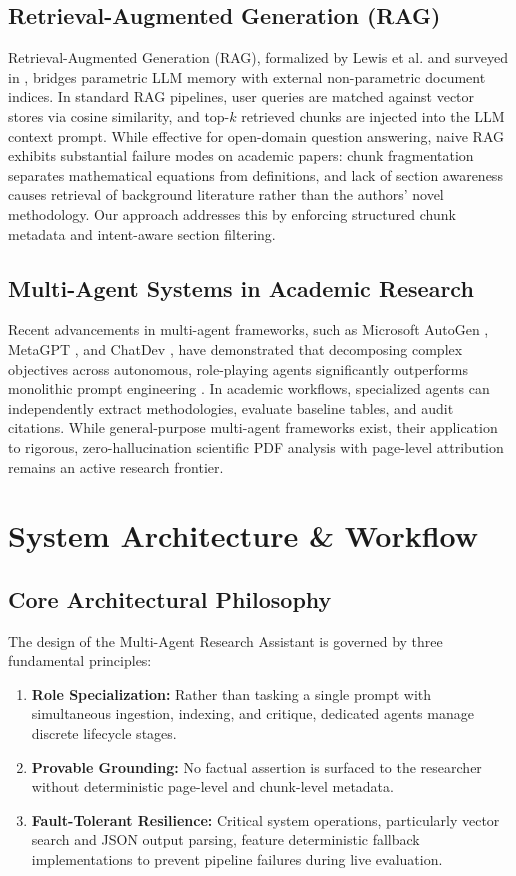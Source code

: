 \documentclass[conference]{IEEEtran}
\begin{document}
\subsection{Retrieval-Augmented Generation (RAG)}
Retrieval-Augmented Generation (RAG), formalized by Lewis et al. \cite{lewis2020rag} and surveyed in \cite{gao2023rag}, bridges parametric LLM memory with external non-parametric document indices. In standard RAG pipelines, user queries are matched against vector stores via cosine similarity, and top-$k$ retrieved chunks are injected into the LLM context prompt. While effective for open-domain question answering, naive RAG exhibits substantial failure modes on academic papers: chunk fragmentation separates mathematical equations from definitions, and lack of section awareness causes retrieval of background literature rather than the authors' novel methodology. Our approach addresses this by enforcing structured chunk metadata and intent-aware section filtering.

\subsection{Multi-Agent Systems in Academic Research}
Recent advancements in multi-agent frameworks, such as Microsoft AutoGen \cite{wu2023autogen}, MetaGPT \cite{hong2023metagpt}, and ChatDev \cite{qian2023communicative}, have demonstrated that decomposing complex objectives across autonomous, role-playing agents significantly outperforms monolithic prompt engineering \cite{wang2023survey}. In academic workflows, specialized agents can independently extract methodologies, evaluate baseline tables, and audit citations. While general-purpose multi-agent frameworks exist, their application to rigorous, zero-hallucination scientific PDF analysis with page-level attribution remains an active research frontier.

\section{System Architecture \& Workflow}

\subsection{Core Architectural Philosophy}
The design of the Multi-Agent Research Assistant is governed by three fundamental principles:
\begin{enumerate}
    \item \textbf{Role Specialization:} Rather than tasking a single prompt with simultaneous ingestion, indexing, and critique, dedicated agents manage discrete lifecycle stages.
    \item \textbf{Provable Grounding:} No factual assertion is surfaced to the researcher without deterministic page-level and chunk-level metadata.
    \item \textbf{Fault-Tolerant Resilience:} Critical system operations, particularly vector search and JSON output parsing, feature deterministic fallback implementations to prevent pipeline failures during live evaluation.
\end{enumerate}
\end{document}
